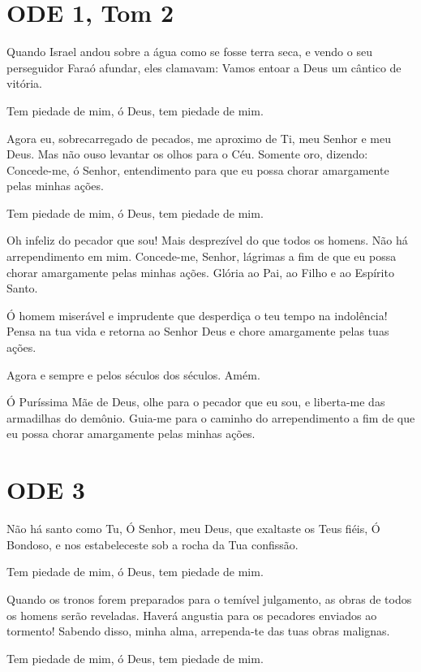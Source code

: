 \documentclass{subfiles}
\begin{document}

\section{ODE 1, Tom 2}

\eirmos{}Quando Israel andou sobre a água como se fosse terra seca, e vendo o seu
perseguidor Faraó afundar, eles clamavam: Vamos entoar a Deus um cântico de
vitória.

Tem piedade de mim, ó Deus, tem piedade de mim.

Agora eu, sobrecarregado de pecados, me aproximo de Ti, meu Senhor e meu Deus.
Mas não ouso levantar os olhos para o Céu. Somente oro, dizendo: Concede-me, ó
Senhor, entendimento para que eu possa chorar amargamente pelas minhas ações.

Tem piedade de mim, ó Deus, tem piedade de mim.

Oh infeliz do pecador que sou! Mais desprezível do que todos os homens. Não há
arrependimento em mim. Concede-me, Senhor, lágrimas a fim de que eu possa chorar
amargamente pelas minhas ações. Glória ao Pai, ao Filho e ao Espírito Santo.

Ó homem miserável e imprudente que desperdiça o teu tempo na
indolência! Pensa na tua vida e retorna ao Senhor Deus e chore amargamente
pelas tuas ações.

Agora e sempre e pelos séculos dos séculos. Amém.

\theotokion{}Ó Puríssima Mãe de Deus, olhe para o pecador que eu sou, e
liberta-me das armadilhas do demônio. Guia-me para o caminho do arrependimento a
fim de que eu possa chorar amargamente pelas minhas ações.

\section{ODE 3}

\eirmos{}Não há santo como Tu, Ó Senhor, meu Deus, que exaltaste os Teus fiéis,
Ó Bondoso, e nos estabeleceste sob a rocha da Tua confissão.

Tem piedade de mim, ó Deus, tem piedade de mim.

Quando os tronos forem preparados para o temível julgamento, as obras de todos
os homens serão reveladas. Haverá angustia para os pecadores enviados ao
tormento! Sabendo disso, minha alma, arrependa-te das tuas obras malignas.

Tem piedade de mim, ó Deus, tem piedade de mim.
\end{document}
